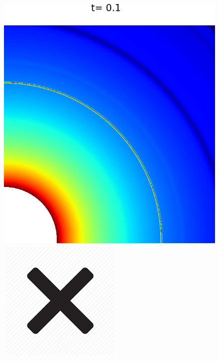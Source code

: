 \documentclass[preprint, 11pt]{article}
\begin{document}
\begin{figure}[!h]
  \centering 
  \includegraphics[scale=0.28]{figures/chj_r2_llf_t0p1.png} \quad
  \includegraphics[scale=0.5]{figures/cross.png} \quad

\end{figure}
\end{document}
